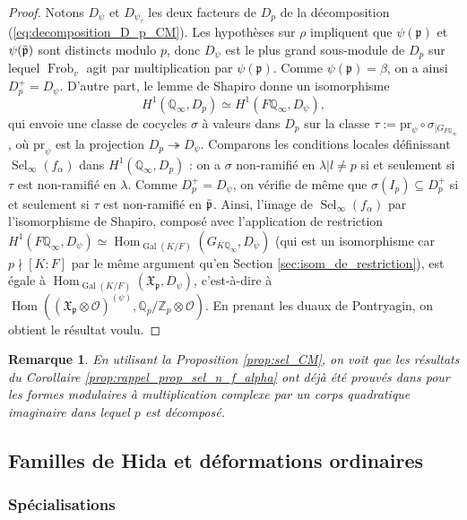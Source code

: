\documentclass[12pt]{amsart}
\newcommand\bQ{\mathbb{Q}}
\newcommand\Zp{{\mathbb{Z}_{p}}}
\newcommand\Qp{\mathbb{Q}_{p}}
\newcommand\cO{\mathcal{O}}
\newcommand\gp{\mathfrak{p}}
\newcommand\gX{\mathfrak{X}}
\newcommand{\ob}[1]{\mkern 1.5mu\overline{\mkern-1.5mu#1\mkern-1.5mu}\mkern 1.5mu}
\DeclareMathOperator{\Gal}{Gal}
\DeclareMathOperator{\Hom}{Hom}
\DeclareMathOperator{\Frob}{Frob}
\DeclareMathOperator{\Sel}{Sel}
\theoremstyle{defstyle}
\newtheorem{remarque}[subsubsection]{Remarque}
\theoremstyle{thmstyle}
\begin{document}
\begin{proof}
	Notons $D_\psi$ et $D_{\psi_\tau}$ les deux facteurs de $D_p$ de la décomposition (\ref{eq:decomposition_D_p_CM}). Les hypothèses sur $\rho$ impliquent que $\psi(\gp)$ et $\psi(\ob{\gp})$ sont distincts modulo $p$, donc $D_\psi$ est le plus grand sous-module de $D_p$ sur lequel $\Frob_v$ agit par multiplication par $\psi(\gp)$. Comme $\psi(\gp)=\beta$, on a ainsi $D_p^+=D_\psi$. D'autre part, le lemme de Shapiro donne un isomorphisme 
	\[H^1(\bQ_\infty,D_p) \simeq H^1(F\bQ_\infty,D_\psi), \]
	qui envoie une classe de cocycles $\sigma$ à valeurs dans $D_p$ sur la classe $\tau:=\textrm{pr}_\psi\circ \sigma_{|G_{F\bQ_\infty}}$, où $\textrm{pr}_\psi$ est la projection $D_p \twoheadrightarrow D_\psi$. Comparons les conditions locales définissant $\Sel_\infty(f_\alpha)$ dans $H^1(\bQ_\infty,D_p)$ : on a $\sigma$ non-ramifié en $\lambda|l\neq p$ si et seulement si $\tau$ est non-ramifié en $\lambda$. Comme $D_p^+=D_\psi$, on vérifie de même que $\sigma(I_p)\subseteq D_p^+$ si et seulement si $\tau$ est non-ramifié en $\ob{\gp}$. Ainsi, l'image de $\Sel_{\infty}(f_\alpha)$ par l'isomorphisme de Shapiro, composé avec l'application de restriction $H^1(F\bQ_\infty,D_\psi)\simeq \Hom_{\Gal(K/F)}(G_{K\bQ_\infty},D_\psi)$ (qui est un isomorphisme car $p\nmid [K:F]$ par le même argument qu'en Section \ref{sec:isom_de_restriction}), est égale à $\Hom_{\Gal(K/F)}(\gX_\gp,D_\psi)$, c'est-à-dire à $\Hom\left(\left(\gX_\gp \otimes \cO\right)^{(\psi)},\Qp/\Zp \otimes \cO\right)$. En prenant les duaux de Pontryagin, on obtient le résultat voulu.
\end{proof}
\begin{remarque}
	En utilisant la Proposition \ref{prop:sel_CM}, on voit que les résultats du Corollaire \ref{prop:rappel_prop_sel_n_f_alpha} ont déjà été prouvés dans \cite[Theorem 5.3 (i)-(iii)-(v)]{rubin1991main} pour les formes modulaires à multiplication complexe par un corps quadratique imaginaire dans lequel $p$ est décomposé. 
\end{remarque}

\subsection{Familles de Hida et déformations ordinaires}
\label{sec:familles_de_Hida}

\subsubsection{Spécialisations} 
\end{document}
